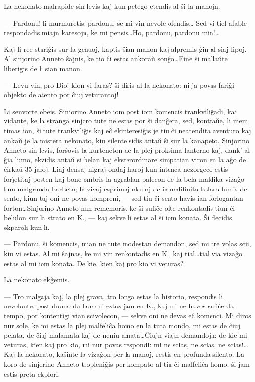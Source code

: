    La nekonato malrapide sin levis kaj kun petego etendis al \^si la
manojn.

 --- Pardonu! li murmuretis: pardonu, se mi vin nevole ofendis\dots
Sed vi tiel afable respondadis miajn karesojn, ke mi pensis\dots Ho,
pardonu, pardonu min!\dots

   Kaj li ree stari\^gis sur la genuoj, kaptis \^sian manon kaj alpremis
\^gin al siaj lipoj. Al sinjorino Anneto \^sajnis, ke tio \^ci estas
ankora\u u son\^go\dots Fine \^si malla\u ute liberigis de li sian
manon.

 --- Levu vin, pro Dio! kion vi faras? \^si diris al la nekonato: ni ja
povas fari\^gi objekto de atento por \^ciuj veturantoj!

   Li senvorte obeis. Sinjorino Anneto iom post iom komencis
trankvili\^gadi, kaj vidante, ke la stranga sinjoro tute ne estas
por \^si dan\^gera, sed, kontra\u ue, li mem timas ion, \^si tute
trankvili\^gis kaj e\^c ekinteresi\^gis je tiu \^ci neatendita
aventuro kaj anka\u u je la mistera nekonato, kiu silente sidis
anta\u u \^si sur la kanapeto. Sinjorino Anneto sin levis,
for\^sovis la kurteneton de la plej proksima lanterno kaj, dank' al
\^gia lumo, ekvidis anta\u u si belan kaj eksterordinare simpatian
viron en la a\^go de \^cirka\u u 35 jaroj. Liaj densaj nigraj ondaj
haroj kun intenca nezorgeco estis for\^{\j}etitaj posten kaj bone
ombris la agrablan palecon de la bela maldika viza\^go kun malgranda
barbeto; la vivaj esprimaj okuloj de ia nedifinita koloro lumis de
sento, kiun tuj oni ne povas kompreni, --- sed tiu \^ci sento havis
ian forlogantan forton\dots Sinjorino Anneto nun rememoris, ke \^si
sufi\^ce ofte renkontadis tiun \^ci belulon sur la strato en K., ---
kaj sekve li estas al \^si iom konata. \^Si decidis ekparoli kun li.

 --- Pardonu, \^si komencis, mian ne tute modestan demandon, sed mi tre
volas scii, kiu vi estas. Al mi \^sajnas, ke mi vin renkontadis en
K., kaj tial\dots tial via viza\^go estas al mi iom konata. De kie,
kien kaj pro kio vi veturas?

   La nekonato ek\^gemis.

 --- Tro malgaja kaj, la plej grava, tro longa estas la historio,
respondis li nevolonte: post duono da horo ni estos jam en K., kaj
mi ne havos sufi\^ce da tempo, por kontentigi vian scivolecon,
--- sekve oni ne devas e\^c komenci. Mi diros nur sole, ke mi estas
la plej malfeli\^ca homo en la tuta mondo, mi estas de \^ciuj
pelata, de \^ciuj malamata kaj de neniu amata\dots \^Ciujn viajn
demandojn: de kie mi veturas, kien kaj pro kio, mi nur povas
respondi: mi ne scias, ne scias, ne scias!\dots Kaj la nekonato,
ka\^sinte la viza\^gon per la manoj, restis en profunda silento. La
koro de sinjorino Anneto tropleni\^gis per kompato al tiu \^ci
malfeli\^ca homo: \^si jam estis preta ekplori.

